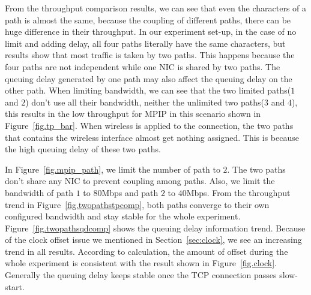 From the throughput comparison results, we can see that even the characters of a path is almost the same, because the coupling of different paths, there can be huge difference in their throughput. In our experiment set-up, in the case of no limit and adding delay, all four paths literally have the same characters, but results show that most traffic is taken by two paths. This happens because the four paths are not independent while one NIC is shared by two paths. The queuing delay generated by one path may also affect the queuing delay on the other path. When limiting bandwidth, we can see that the two limited paths($1$ and $2$) don't use all their bandwidth, neither the unlimited two paths($3$ and $4$), this results in the low throughput for MPIP in this scenario shown in Figure~\ref{fig.tp_bar}. When wireless is applied to the connection, the two paths that contains the wireless interface almost get nothing assigned. This is because the high queuing delay of these two paths.

In Figure~\ref{fig.mpip_path}, we limit the number of path to $2$. The two paths don't share any NIC to prevent coupling among paths. Also, we limit the bandwidth of path $1$ to $80$Mbps and path $2$ to $40$Mbps. From the throughput trend in Figure~\ref{fig.twopathstpcomp}, both paths converge to their own configured bandwidth and stay stable for the whole experiment. Figure~\ref{fig.twopathsqdcomp} shows the queuing delay information trend. Because of the clock offset issue we mentioned in Section~\ref{sec:clock}, we see an increasing trend in all results. According to calculation, the amount of offset during the whole experiment is consistent with the result shown in Figure~\ref{fig.clock}. Generally the queuing delay keeps stable once the TCP connection passes slow-start.


